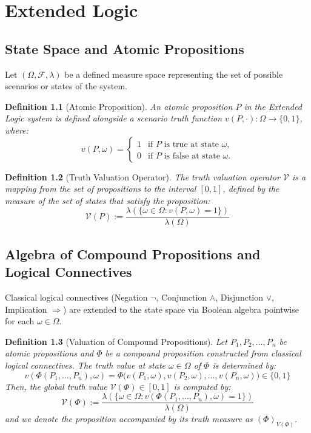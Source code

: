 \documentclass[a4paper,12pt,twoside]{memoir}
\newtheorem{definition}{Definition}[chapter]
\newcommand{\ddclmd}{\mathcal{V}} %
\begin{document}
	\newpage
	
	\chapter{Extended Logic}
	
	\section{State Space and Atomic Propositions}
	Let $(\Omega, \mathcal{F}, \lambda)$ be a defined measure space representing the set of possible scenarios or states of the system.
	
	\begin{definition}[Atomic Proposition]
		An atomic proposition $P$ in the Extended Logic system is defined alongside a scenario truth function $v(P, \cdot) : \Omega \to \{0, 1\}$, where:
		\[
		v(P, \omega) = \begin{cases}
			1 & \text{if } P \text{ is true at state } \omega,   \\
			0 & \text{if } P \text{ is false at state } \omega.
		\end{cases}
		\]
	\end{definition}
	
	\begin{definition}[Truth Valuation Operator]
		The truth valuation operator $\ddclmd$ is a mapping from the set of propositions to the interval $[0, 1]$, defined by the measure of the set of states that satisfy the proposition:
		\[
		\ddclmd(P) := \frac{\lambda(\{\omega \in \Omega : v(P, \omega) = 1\})}{\lambda(\Omega)}
		\]
	\end{definition}
	
	\section{Algebra of Compound Propositions and Logical Connectives}
	Classical logical connectives (Negation $\neg$, Conjunction $\land$, Disjunction $\lor$, Implication $\Rightarrow$) are extended to the state space via Boolean algebra pointwise for each $\omega \in \Omega$.
	
	\begin{definition}[Valuation of Compound Propositions]
		Let $P_1, P_2, \dots, P_n$ be atomic propositions and $\Phi$ be a compound proposition constructed from classical logical connectives. The truth value at state $\omega \in \Omega$ of $\Phi$ is determined by:
		\[
		v(\Phi(P_1, \dots, P_n), \omega) = \Phi\big(v(P_1, \omega), v(P_2, \omega), \dots, v(P_n, \omega)\big) \in \{0, 1\}
		\]
		Then, the global truth value $\ddclmd(\Phi) \in [0, 1]$ is computed by:
		\[
		\ddclmd(\Phi) := \frac{\lambda(\{\omega \in \Omega : v(\Phi(P_1, \dots, P_n), \omega) = 1\})}{\lambda(\Omega)}
		\]
		and we denote the proposition accompanied by its truth measure as $(\Phi)_{V(\Phi)}$.
	\end{definition}
	
\end{document}
